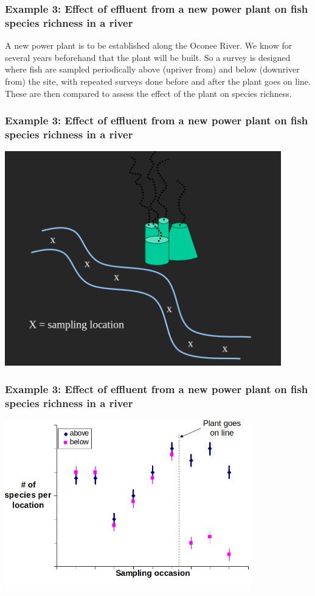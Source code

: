 \documentclass[color=usenames,dvipsnames]{beamer}\usepackage[]{graphicx}\usepackage[]{color}
\begin{document}
\begin{frame}
  \frametitle{Example 3: Effect of effluent from a new power plant on
    fish species richness in a river}
  A new power plant is to be established along the Oconee River.  We
  know for several years beforehand that the plant will be built.  So
  a survey is designed where fish are sampled periodically above
  (upriver from) and below (downriver from) the site, with repeated
  surveys done before and after the plant goes on line.  These are
  then compared to assess the effect of the plant on species richness.   
\end{frame}


\begin{frame}
  \frametitle{Example 3: Effect of effluent from a new power plant on
    fish species richness in a river}
  \centering
  \includegraphics[width=0.9\textwidth]{power-plant-river} \\
\end{frame}


\begin{frame}
  \frametitle{Example 3: Effect of effluent from a new power plant on
    fish species richness in a river}
  \centering
  \includegraphics[width=0.8\textwidth]{power-plant} \\
\end{frame}
\end{document}

